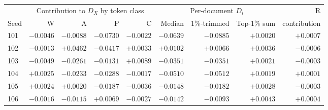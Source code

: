 \begin{tabular}{@{}lrrrrrrrr@{}}
\toprule
 & \multicolumn{4}{c}{Contribution to $D_X$ by token class} & \multicolumn{3}{c}{Per-document $D_i$} & R \\
\cmidrule(lr){2-5}\cmidrule(lr){6-8}
Seed & W & A & P & C & Median & 1\%-trimmed & Top-1\% sum & contribution \\
\midrule
101 & $-0.0046$ & $-0.0088$ & $-0.0730$ & $-0.0022$ & $-0.0639$ & $-0.0885$ & ${+}0.0020$ & ${+}0.0007$ \\
102 & $-0.0013$ & ${+}0.0462$ & $-0.0417$ & ${+}0.0033$ & ${+}0.0102$ & ${+}0.0066$ & ${+}0.0036$ & $-0.0006$ \\
103 & $-0.0049$ & $-0.0261$ & $-0.0131$ & ${+}0.0089$ & $-0.0351$ & $-0.0351$ & ${+}0.0021$ & $-0.0003$ \\
104 & ${+}0.0025$ & $-0.0233$ & $-0.0288$ & $-0.0017$ & $-0.0510$ & $-0.0512$ & ${+}0.0019$ & ${+}0.0001$ \\
105 & ${+}0.0024$ & ${+}0.0020$ & $-0.0187$ & $-0.0036$ & $-0.0148$ & $-0.0182$ & ${+}0.0028$ & $-0.0003$ \\
106 & $-0.0016$ & $-0.0115$ & ${+}0.0069$ & $-0.0027$ & $-0.0142$ & $-0.0093$ & ${+}0.0043$ & ${+}0.0004$ \\
\bottomrule
\end{tabular}
